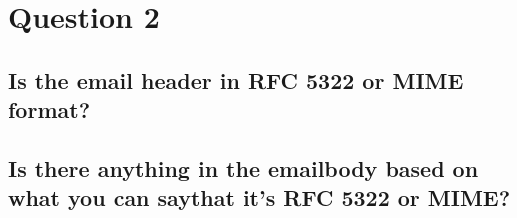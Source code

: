 \documentclass{report}
\begin{document}
	\section{Question 2}
	\startsection
		\renewcommand{\thesubsection}{\thesection.\Alph{subsection}}
		\subsection{Is the email header in RFC 5322 or MIME format?}
		\startsubsection
		\closesection
		\subsection{Is there anything in the emailbody based on what you can saythat it's RFC 5322 or MIME?}
		\startsubsection
		\closesection
	\closesection
\end{document}
